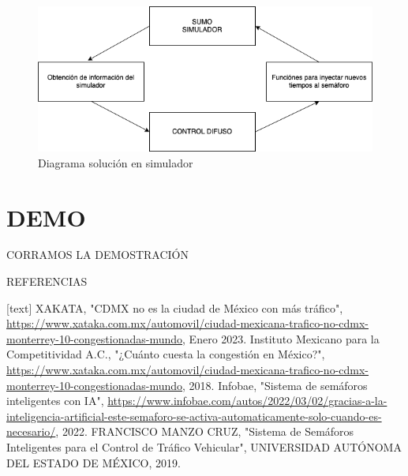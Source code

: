 \documentclass[
	11pt, %
]{beamer}
\begin{document}
\begin{frame}
  \begin{figure}
    \includegraphics[width=0.9
      \linewidth]{diagrama_sumo.png}
    \caption{Diagrama solución en simulador}
  \end{figure}
\end{frame}

\section{DEMO}
\begin{frame}
  \begin{center}
    CORRAMOS LA DEMOSTRACIÓN
  \end{center}
\end{frame}

\begin{frame}{REFERENCIAS}
  \begin{thebibliography}{10}
    [text]
    XAKATA, "CDMX no es la ciudad de México con más tráfico", \url{https://www.xataka.com.mx/automovil/ciudad-mexicana-trafico-no-cdmx-monterrey-10-congestionadas-mundo}, Enero 2023.
    Instituto Mexicano para la Competitividad A.C., "¿Cuánto cuesta la congestión en México?", \url{https://www.xataka.com.mx/automovil/ciudad-mexicana-trafico-no-cdmx-monterrey-10-congestionadas-mundo}, 2018.
    Infobae, "Sistema de semáforos inteligentes con IA", \url{https://www.infobae.com/autos/2022/03/02/gracias-a-la-inteligencia-artificial-este-semaforo-se-activa-automaticamente-solo-cuando-es-necesario/}, 2022.
    FRANCISCO MANZO CRUZ, "Sistema de Semáforos Inteligentes para el Control de Tráfico Vehicular", UNIVERSIDAD AUTÓNOMA DEL ESTADO DE MÉXICO, 2019.
  
    
  \end{thebibliography}
\end{frame}
\end{document}
